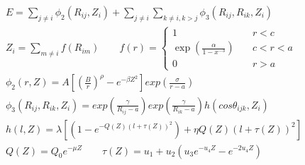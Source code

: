 \documentclass[12pt]{article}
\begin{document}
\begin{eqnarray*}
E = \sum_{j \ne i} \phi_{2}(R_{ij}, Z_{i}) + \sum_{j \ne i} \sum_{k \ne i,k > j} \phi_{3}(R_{ij}, R_{ik}, Z_{i}) \\
Z_i = \sum_{m \ne i} f(R_{im}) \qquad
  f(r) = \begin{cases} 
         1 & \quad r<c \\
         \exp\left(\frac{\alpha}{1-x^{-3}}\right) & \quad c<r<a \\
         0 & \quad r>a
         \end{cases} \\
\phi_{2}(r, Z) = A\left[\left(\frac{B}{r}\right)^{\rho} - e^{-\beta Z^2}\right]exp{\left(\frac{\sigma}{r-a}\right)} \\
\phi_{3}(R_{ij}, R_{ik}, Z_i) = exp{\left(\frac{\gamma}{R_{ij}-a}\right)}exp{\left(\frac{\gamma}{R_{ik}-a}\right)}h(cos\theta_{ijk},Z_i) \\
h(l,Z) = \lambda [(1-e^{-Q(Z)(l+\tau(Z))^2}) + \eta Q(Z)(l+\tau(Z))^2 ] \\
Q(Z) = Q_0 e^{-\mu Z} \qquad \tau(Z) = u_1 + u_2 (u_3 e^{-u_4 Z} - e^{-2u_4 Z})
\end{eqnarray*}
\end{document}
